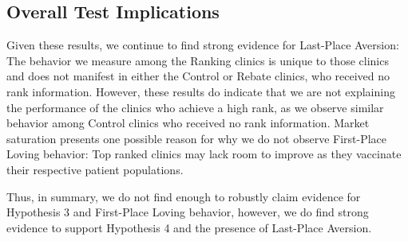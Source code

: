 \subsection{Overall Test Implications}
Given these results, we continue to find strong evidence for Last-Place Aversion: The behavior we measure among the Ranking clinics is unique to those clinics and does not manifest in either the Control or Rebate clinics, who received no rank information. However, these results do indicate that we are not explaining the performance of the clinics who achieve a high rank, as we observe similar behavior among Control clinics who received no rank information. Market saturation presents one possible reason for why we do not observe First-Place Loving behavior: Top ranked clinics may lack room to improve as they vaccinate their respective patient populations. 

Thus, in summary, we do not find enough to robustly claim evidence for Hypothesis 3 and First-Place Loving behavior, however, we do find strong evidence to support Hypothesis 4 and the presence of Last-Place Aversion. 

